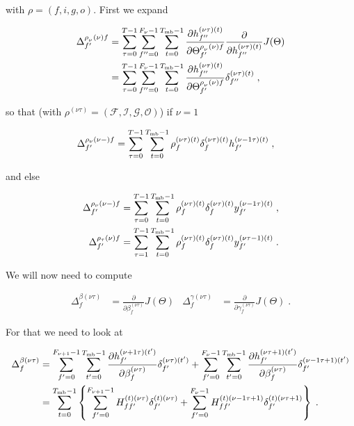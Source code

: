 \begin{subappendices}
with $\rho = (f,i,g,o)$. First we expand

\begin{align}
\Delta^{\rho_{_\nu}(\nu)f}_{f'}&=\sum_{\tau=0}^{T-1}\sum_{f''=0}^{F_\nu-1}\sum_{t=0}^{T_{{\rm mb}}-1}
%
\frac{\partial h^{(\nu\tau)(t)}_{f''}}{\partial \Theta^{\rho_{_\nu}(\nu)f}_{f'}}
%
\frac{\partial}{\partial h^{(\nu\tau)(t)}_{f''}} J(\Theta)\notag\\
%
&=\sum_{\tau=0}^{T-1}\sum_{f''=0}^{F_\nu-1}\sum_{t=0}^{T_{{\rm mb}}-1}
%
\frac{\partial h^{(\nu\tau)(t)}_{f''}}{\partial \Theta^{\rho_{_\nu}(\nu)f}_{f'}}
%
\delta^{(\nu\tau)(t)}_{f''}\;,
\end{align}

so that (with $\rho^{(\nu\tau)}=\left(\mathcal{F},\mathcal{I},\mathcal{G},\mathcal{O}\right)$) if $\nu=1$

\begin{align}
\Delta^{\rho_\nu(\nu-)f}_{f'}&=\sum_{\tau=0}^{T-1}\sum_{t=0}^{T_{{\rm mb}}-1}
%
\rho^{(\nu\tau)(t)}_{f}\delta^{(\nu\tau)(t)}_{f}h^{(\nu-1\tau)(t)}_{f'}\;,
\end{align}

and else

\begin{align}
\Delta^{\rho_\nu(\nu-)f}_{f'}&=\sum_{\tau=0}^{T-1}\sum_{t=0}^{T_{{\rm mb}}-1}
%
\rho^{(\nu\tau)(t)}_{f}\delta^{(\nu\tau)(t)}_{f}y^{(\nu-1\tau)(t)}_{f'}\;,\\
%
\Delta^{\rho_\tau(\nu)f}_{f'}&=\sum_{\tau=1}^{T-1}\sum_{t=0}^{T_{{\rm mb}}-1}
%
\rho^{(\nu\tau)(t)}_{f}\delta^{(\nu\tau)(t)}_{f}y^{(\nu\tau-1)(t)}_{f'}\;.
\end{align}

We will now need to compute

\begin{align}
\Delta^{\beta(\nu\tau)}_{f}&=\frac{\partial}{\partial \beta^{(\nu\tau)}_f} J(\Theta)&
%
\Delta^{\gamma(\nu\tau)}_{f}&=\frac{\partial}{\partial \gamma^{(\nu\tau)}_f} J(\Theta)\;.
\end{align}

For that we need to look at 

\begin{align}
\Delta^{\beta(\nu\tau)}_{f}&=\sum_{f'=0}^{F_{\nu+1}-1}\sum_{t'=0}^{T_{{\rm mb}}-1}
%
\frac{\partial h^{(\nu+1\tau)(t')}_{f'}}{\partial \beta^{(\nu\tau)}_f}\delta^{(\nu\tau)(t')}_{f'}
%
+\sum_{f'=0}^{F_{\nu}-1}\sum_{t'=0}^{T_{{\rm mb}}-1}\frac{\partial h^{(\nu\tau+1)(t')}_{f'}}
%
{\partial \beta^{(\nu\tau)}_f}\delta^{(\nu-1\tau+1)(t')}_{f'}\notag\\
%
&=\sum_{t=0}^{T_{{\rm mb}}-1}\left\{\sum_{f'=0}^{F_{\nu+1}-1}
%
H^{(t)(\nu\tau)}_{ff'}\delta^{(t)(\nu\tau)}_{f'}
%
+\sum_{f'=0}^{F_{\nu}-1}H^{(t)(\nu-1\tau+1)}_{ff'}\delta^{(t)(\nu\tau+1)}_{f'}\right\}\;. 
\end{align}


\end{subappendices}
